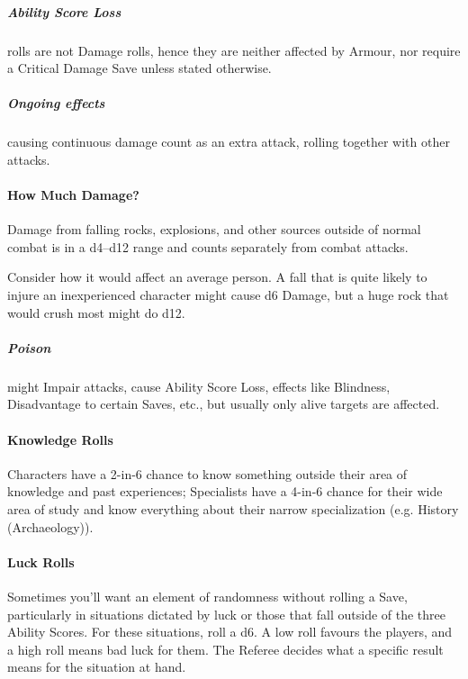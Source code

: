 \documentclass[itdr/core]{subfiles}
\begin{document}
\subparagraph{Ability Score Loss} rolls are not Damage rolls, hence they are neither affected by Armour, nor require a Critical Damage Save unless stated otherwise.

\subparagraph{Ongoing effects} causing continuous damage count as an extra attack, rolling together with other attacks.

\vfill

\paragraph{How Much Damage?}
Damage from falling rocks, explosions, and other sources outside of normal combat is in a d4--d12 range and counts separately from combat attacks.

Consider how it would affect an average person. A fall that is quite likely to injure an inexperienced character might cause d6 Damage, but a huge rock that would crush most might do d12.

\subparagraph{Poison} might Impair attacks, cause Ability Score Loss, effects like Blindness, Disadvantage to certain Saves, etc., but usually only alive targets are affected.

\vfill

\paragraph{Knowledge Rolls}
Characters have a 2-in-6 chance to know something outside their area of knowledge and past experiences; Specialists have a 4-in-6 chance for their wide area of study and know everything about their narrow specialization (e.g. History (Archaeology)).

\vfill

\paragraph{Luck Rolls}
Sometimes you'll want an element of randomness without rolling a Save, particularly in situations dictated by luck or those that fall outside of the three Ability Scores. For these situations, roll a d6. A low roll favours the players, and a high roll means bad luck for them. The Referee decides what a specific result means for the situation at hand.

\vfill
\end{document}
